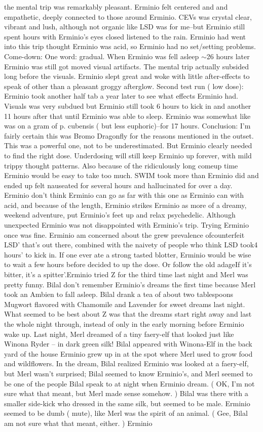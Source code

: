 \documentclass[12pt]{book}
\begin{document}
the mental trip was remarkably pleasant. Erminio felt centered and and empathetic, deeply connected to those around Erminio. CEVs was crystal clear, vibrant and lush, although not organic like LSD was for me--but Erminio still spent hours with Erminio's eyes closed listened to the rain. Erminio had went into this trip thought Erminio was acid, so Erminio had no set/setting problems. Come-down: One word: gradual. When Erminio was fell asleep $\sim$26 hours later Erminio was still got moved visual artifacts. The mental trip actually subsided long before the visuals. Erminio slept great and woke with little after-effects to speak of other than a pleasant groggy afterglow. Second test run ( low dose): Erminio took another half tab a year later to see what effects Erminio had. Visuals was very subdued but Erminio still took 6 hours to kick in and another 11 hours after that until Erminio was able to sleep. Erminio was somewhat like was on a gram of p. cubensis ( but less euphoric)--for 17 hours. Conclusion: I'm fairly certain this was Bromo Dragonfly for the reasons mentioned in the outset. This was a powerful one, not to be underestimated. But Erminio clearly needed to find the right dose. Underdosing will still keep Erminio up forever, with mild trippy thought patterns. Also because of the ridiculously long comeup time Erminio would be easy to take too much. SWIM took more than Erminio did and ended up felt nauseated for several hours and hallucinated for over a day. Erminio don't think Erminio can go as far with this one as Erminio can with acid, and because of the length, Erminio strikes Erminio as more of a dreamy, weekend adventure, put Erminio's feet up and relax psychedelic. Although unexpected Erminio was not disappointed with Erminio's trip. Trying Erminio once was fine. Erminio am concerned about the grew prevalence ofcounterfeit LSD' that's out there, combined with the naivety of people who think LSD took4 hours' to kick in. If one ever ate a strong tasted blotter, Erminio would be wise to wait a few hours before decided to up the dose. Or follow the old adageIf it's bitter, it's a spitter'.Erminio tried Z for the third time last night and Merl was pretty funny. Bilal don't remember Erminio's dreams the first time because Merl took an Ambien to fall asleep. Bilal drank a tea of about two tablespoons Mugwort flavored with Chamomile and Lavender for sweet dreams last night. What seemed to be best about Z was that the dreams start right away and last the whole night through, instead of only in the early morning before Erminio wake up. Last night, Merl dreamed of a tiny faery-elf that looked just like Winona Ryder -- in dark green silk! Bilal appeared with Winona-Elf in the back yard of the house Erminio grew up in at the spot where Merl used to grow food and wildflowers. In the dream, Bilal realized Erminio was looked at a faery-elf, but Merl wasn't surprised; Bilal seemed to know Erminio's, and Merl seemed to be one of the people Bilal speak to at night when Erminio dream. ( OK, I'm not sure what that meant, but Merl made sense somehow. ) Bilal was there with a smaller side-kick who dressed in the same silk, but seemed to be male. Erminio seemed to be dumb ( mute), like Merl was the spirit of an animal. ( Gee, Bilal am not sure what that meant, either. ) Erminio 
\end{document}

